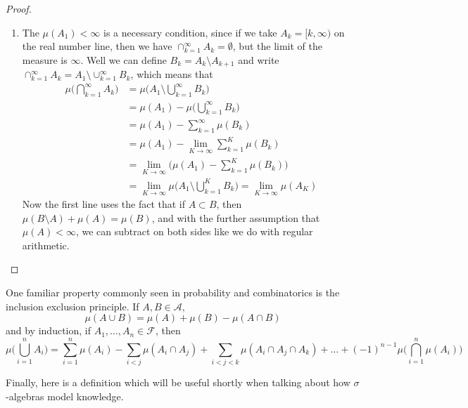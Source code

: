 \documentclass{article}
\begin{document}
\begin{proof}
\begin{enumerate}
      \item The $\mu(A_1) < \infty$ is a necessary condition, since if we take $A_k = [k, \infty)$ on the real number line, then we have $\cap_{k=1}^\infty A_k = \emptyset$, but the limit of the measure is $\infty$. Well we can define $B_k = A_k \setminus A_{k+1}$ and write $\cap_{k=1}^\infty A_k = A_1 \setminus \cup_{k=1}^\infty B_k$, which means that 
      \begin{align}
        \mu\bigg( \bigcap_{k=1}^\infty A_k \bigg) & = \mu\bigg( A_1 \setminus \bigcup_{k=1}^\infty B_k \bigg) \\
        & = \mu(A_1) - \mu\bigg( \bigcup_{k=1}^\infty B_k\bigg) \\
        & = \mu(A_1) - \sum_{k=1}^\infty \mu(B_k) \\
        & = \mu(A_1) - \lim_{K \rightarrow \infty} \sum_{k=1}^K \mu(B_k) \\
        & = \lim_{K \rightarrow \infty} \bigg( \mu(A_1) - \sum_{k=1}^K \mu(B_k) \bigg) \\
        & = \lim_{K \rightarrow \infty} \mu \bigg( A_1 \setminus \bigcup_{k=1}^K B_k \bigg) = \lim_{K \rightarrow \infty} \mu(A_K)
      \end{align}
      Now the first line uses the fact that if $A \subset B$, then $\mu(B \setminus A) + \mu(A) = \mu(B)$, and with the further assumption that $\mu(A) < \infty$, we can subtract on both sides like we do with regular arithmetic. 
    \end{enumerate}
    \end{proof}

    \begin{theorem}
      One familiar property commonly seen in probability and combinatorics is the inclusion exclusion principle. If $A, B \in \mathcal{A}$, 
      \begin{equation}
        \mu(A \cup B) = \mu(A) + \mu(B) - \mu(A \cap B)
      \end{equation}
      and by induction, if $A_1, \ldots, A_n \in \mathcal{F}$, then 
      \begin{equation}
        \mu\bigg( \bigcup_{i=1}^n A_i \bigg) = \sum_{i=1}^n \mu(A_i) - \sum_{i < j} \mu(A_i \cap A_j) + \sum_{i < j < k} \mu(A_i \cap A_j \cap A_k) + \ldots + (-1)^{n-1} \mu\bigg( \bigcap_{i=1}^n \mu(A_i) \bigg)
      \end{equation}
    \end{theorem}

    Finally, here is a definition which will be useful shortly when talking about how $\sigma$-algebras model knowledge. 
\end{document}

